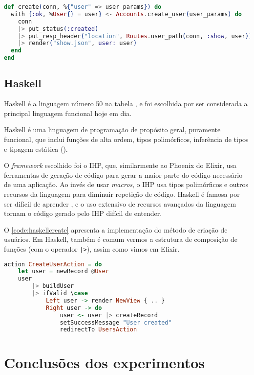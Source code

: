 \begin{lstlisting}[language=Elixir,label={code:elixircreate},caption={Função de criação de usuário em Elixir com Phoenix}]
def create(conn, %{"user" => user_params}) do
  with {:ok, %User{} = user} <- Accounts.create_user(user_params) do
    conn
    |> put_status(:created)
    |> put_resp_header("location", Routes.user_path(conn, :show, user))
    |> render("show.json", user: user)
  end
end
\end{lstlisting}

\subsection{Haskell}\label{subsec:haskell}

Haskell é a linguagem número 50 na tabela \textcite{tiobeindex}, e foi escolhida
por ser considerada a principal linguagem funcional hoje em dia.

Haskell é uma linguagem de programação de propósito geral, puramente funcional,
que inclui funções de alta ordem, tipos polimórficos, inferência de tipos e
tipagem estática (\textcite{conceptionoffunctionalpl}).

O \textit{framework} escolhido foi o IHP, que, similarmente ao Phoenix do Elixir,
usa ferramentas de geração de código para gerar a maior parte do código necessário
de uma aplicação. Ao invés de usar \textit{macros}, o IHP usa tipos polimórficos
e outros recursos da linguagem para diminuir repetição de código. Haskell é
famosa por ser difícil de aprender \cite{haskellintroduction}, e o uso extensivo de recursos avançados
da linguagem tornam o código gerado pelo IHP difícil de entender.

O \autoref{code:haskellcreate} apresenta a implementação do método de criação de
usuários. Em Haskell, também é comum vermos a estrutura de composição de funções
(com o operador \texttt{|>}), assim como vimos em Elixir.

\begin{lstlisting}[language=Haskell,label={code:haskellcreate},caption={Função de criação de usuário em Haskell com IHP}]
action CreateUserAction = do
    let user = newRecord @User
    user
        |> buildUser
        |> ifValid \case
            Left user -> render NewView { .. } 
            Right user -> do
                user <- user |> createRecord
                setSuccessMessage "User created"
                redirectTo UsersAction
\end{lstlisting}

\section{Conclusões dos experimentos}

